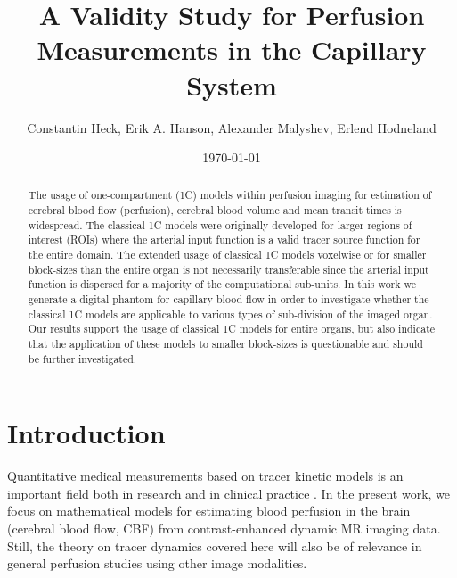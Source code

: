 \documentclass[paper=a4, fontsize=11pt,parskip=half,headings=small]{scrartcl}
\title{A Validity Study for Perfusion Measurements in the Capillary System}
\author{Constantin Heck, Erik A. Hanson, Alexander Malyshev, Erlend Hodneland }
\date{\today}
\begin{document}
	\maketitle

	\begin{abstract}
		The usage of one-compartment (1C) models within perfusion imaging for estimation of cerebral blood flow (perfusion), cerebral blood volume and mean transit times is widespread. The classical 1C models were originally developed for larger regions of interest (ROIs) where the arterial input function is a valid tracer source function for the entire domain. The extended usage of classical 1C models voxelwise or for smaller block-sizes than the entire organ is not necessarily transferable since the arterial input function is dispersed for a majority of the computational sub-units. In this work we generate a digital phantom for capillary blood flow in order to investigate whether the classical 1C models are applicable to various types of sub-division of the imaged organ. Our results support the usage of classical 1C models for entire organs, but also indicate that the application of these models to smaller block-sizes is questionable and should be further investigated.
	\end{abstract}

	\section{Introduction}
	
	Quantitative medical measurements based on tracer kinetic models is an important field both in research and in clinical practice \cite{zierler62,axel80,zierler00}. 
	In the present work, we focus on mathematical models for estimating blood perfusion in the brain (cerebral blood flow, CBF) from contrast-enhanced dynamic MR 	imaging data. Still, the theory on tracer dynamics covered here will also be of relevance in general perfusion studies using other image modalities.
\end{document}
